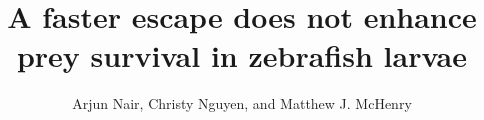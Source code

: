 \documentclass[]{rsos}%
\begin{document}
\title{A faster escape does not enhance prey survival in zebrafish larvae}


\author{%
Arjun Nair, Christy Nguyen, and Matthew J. McHenry}

\address{Department of Ecology and Evolutionary Biology\\
University of California, Irvine\\
321 Steinhaus Hall\\
Irvine, CA 92697}

\subject{Animal behavior, biomechanics}






\maketitle




\linespread{1.6}\selectfont %
\end{document}
